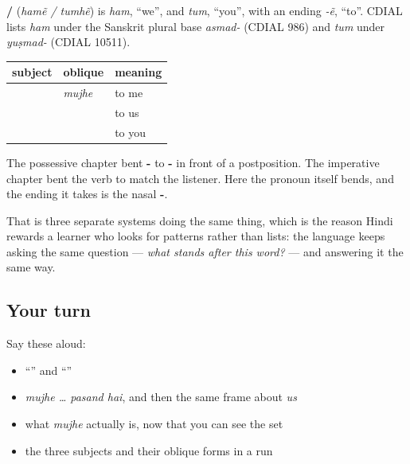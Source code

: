 \begin{cousinweb}
\textbf{ / } (\emph{hamẽ / tumhẽ}) is \emph{ham}, \textquotedblleft{}we\textquotedblright{}, and \emph{tum}, \textquotedblleft{}you\textquotedblright{}, with an ending \emph{-ẽ}, \textquotedblleft{}to\textquotedblright{}. CDIAL lists \emph{ham} under the Sanskrit plural base \emph{asmad-} (CDIAL 986) and \emph{tum} under \emph{yuṣmad-} (CDIAL 10511).
\end{cousinweb}

\begin{grammarlens}[title={Grammar Lens: the same bend, a third time}]
\noindent
\begin{tabularx}{\linewidth}{@{}>{\raggedright\arraybackslash}X>{\raggedright\arraybackslash}X>{\raggedright\arraybackslash}X@{}}
\toprule
\textbf{subject} & \textbf{oblique} & \textbf{meaning} \\
\midrule
\hi{मैं} & \emph{mujhe} & to me \\
\hi{हम} & \textbf{\hi{हमें}} & to us \\
\hi{तुम} & \textbf{\hi{तुम्हें}} & to you \\
\bottomrule
\end{tabularx}

The possessive chapter bent \textbf{-} to \textbf{-} in front of a postposition. The imperative chapter bent the verb to match the listener. Here the pronoun itself bends, and the ending it takes is the nasal \textbf{-}.

That is three separate systems doing the same thing, which is the reason Hindi rewards a learner who looks for patterns rather than lists: the language keeps asking the same question — \emph{what stands after this word?} — and answering it the same way.
\end{grammarlens}

\subsection*{Your turn}
Say these aloud:

\begin{itemize}
\raggedright
  \item \textquotedblleft{}\textquotedblright{} and \textquotedblleft{}\textquotedblright{}
  \item \emph{mujhe … pasand hai}, and then the same frame about \emph{us}
  \item what \emph{mujhe} actually is, now that you can see the set
  \item the three subjects and their oblique forms in a run
\end{itemize}

